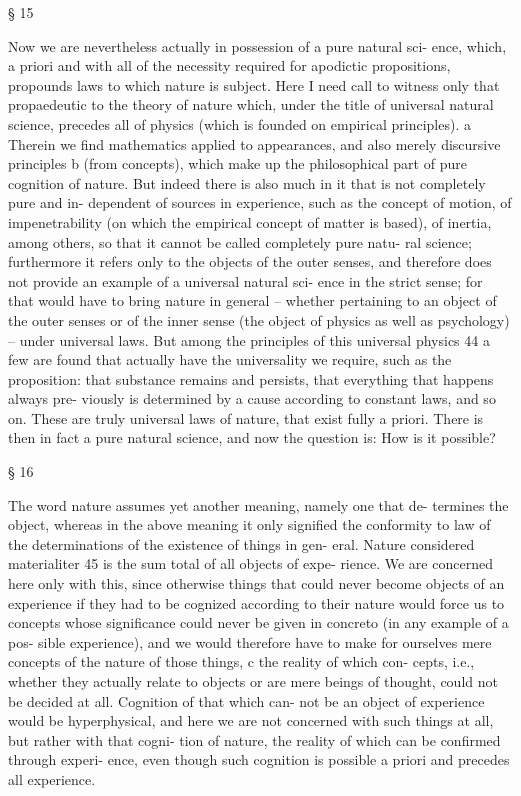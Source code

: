 § 15

Now we are nevertheless actually in possession of a pure natural sci-
ence, which, a priori and with all of the necessity required for apodictic
propositions, propounds laws to which nature is subject. Here I need call
to witness only that propaedeutic to the theory of nature which, under
the title of universal natural science, precedes all of physics (which is
founded on empirical principles). a Therein we ﬁnd mathematics applied
to appearances, and also merely discursive principles b (from concepts),
which make up the philosophical part of pure cognition of nature.
But indeed there is also much in it that is not completely pure and in-
dependent of sources in experience, such as the concept of motion, of
impenetrability (on which the empirical concept of matter is based), of
inertia, among others, so that it cannot be called completely pure natu-
ral science; furthermore it refers only to the objects of the outer senses,
and therefore does not provide an example of a universal natural sci-
ence in the strict sense; for that would have to bring nature in general –
whether pertaining to an object of the outer senses or of the inner sense
(the object of physics as well as psychology) – under universal laws. But
among the principles of this universal physics 44 a few are found that
actually have the universality we require, such as the proposition: that
substance remains and persists, that everything that happens always pre-
viously is determined by a cause according to constant laws, and so on.
These are truly universal laws of nature, that exist fully a priori. There
is then in fact a pure natural science, and now the question is: How is it
possible?

§ 16

The word nature assumes yet another meaning, namely one that de-
termines the object, whereas in the above meaning it only signiﬁed the
conformity to law of the determinations of the existence of things in gen-
eral. Nature considered materialiter 45 is the sum total of all objects of expe-
rience. We are concerned here only with this, since otherwise things
that could never become objects of an experience if they had to be
cognized according to their nature would force us to concepts whose
signiﬁcance could never be given in concreto (in any example of a pos-
sible experience), and we would therefore have to make for ourselves
mere concepts of the nature of those things, c the reality of which con-
cepts, i.e., whether they actually relate to objects or are mere beings
of thought, could not be decided at all. Cognition of that which can-
not be an object of experience would be hyperphysical, and here we
are not concerned with such things at all, but rather with that cogni-
tion of nature, the reality of which can be conﬁrmed through experi-
ence, even though such cognition is possible a priori and precedes all
experience.

